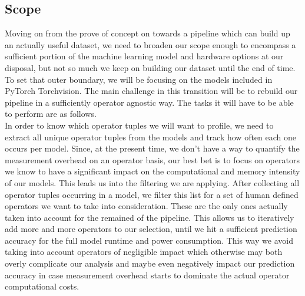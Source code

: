 \documentclass[conference]{IEEEtran}
\begin{document}
\subsection{Scope}
Moving on from the prove of concept on towards a pipeline which can build up an actually useful dataset, we need to broaden our scope enough to encompass a sufficient portion of the machine learning model and hardware options at our disposal, but not so much we keep on building our dataset until the end of time.
To set that outer boundary, we will be focusing on the models included in PyTorch Torchvision. The main challenge in this transition will be to rebuild our pipeline in a sufficiently operator agnostic way. The tasks it will have to be able to perform are as follows. \\
In order to know which operator tuples we will want to profile, we need to extract all unique operator tuples from the models and track how often each one occurs per model. Since, at the present time, we don’t have a way to quantify the measurement overhead on an operator basis, our best bet is to focus on operators we know to have a significant impact on the computational and memory intensity of our models. This leads us into the filtering we are applying. After collecting all operator tuples occurring in a model, we filter this list for a set of human defined operators we want to take into consideration. These are the only ones actually taken into account for the remained of the pipeline. This allows us to iteratively add more and more operators to our selection, until we hit a sufficient prediction accuracy for the full model runtime and power consumption.  This way we avoid taking into account operators of negligible impact which otherwise may both overly complicate our analysis and maybe even negatively impact our prediction accuracy in case measurement overhead starts to dominate the actual operator computational costs. 
\end{document}
